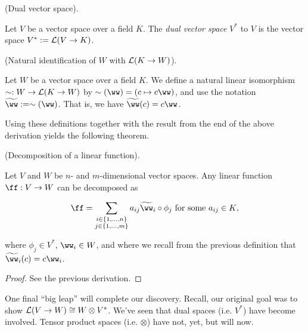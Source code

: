 \begin{defn}
\label{ch::motivated_intro::defn::dual_space_1}
    (Dual vector space).
    
    Let $V$ be a vector space over a field $K$. The \textit{dual vector space} $V^*$ to $V$ is the vector space $V^* := \mathcal{L}(V \rightarrow K)$.
\end{defn}

\begin{defn}
\label{ch::lin_alg::defn::iso_V_to_linear_functions_K_V}
    (Natural identification of $W$ with $\mathcal{L}(K \rightarrow W)$).

    Let $W$ be a vector space over a field $K$. We define a natural linear isomorphism $\sim:W \rightarrow \mathcal{L}(K \rightarrow W)$ by $\sim(\ww) = (c \mapsto c\ww)$, and use the notation $\tww := \sim(\ww)$. That is, we have $\tww(c) = c\ww$.
\end{defn}

Using these definitions together with the result from the end of the above derivation yields the following theorem.

\begin{theorem}
\label{ch::motivated_intro::thm::decomposition_of_a_linear_function}
    (Decomposition of a linear function).
    
    Let $V$ and $W$ be $n$- and $m$-dimensional vector spaces. Any linear function $\ff:V \rightarrow W$ can be decomposed as
    
    \begin{align*}
        \ff = \sum_{\substack{i \in \{1, ..., n\} \\ j \in \{1, ..., m\}}} a_{ij} \tww_i \circ \phi_j \text{ for some $a_{ij} \in K$},
    \end{align*}
    
    where $\phi_j \in V^*$, $\ww_i \in W$, and where we recall from the previous definition that $\tww_i(c) = c\ww_i$.
\end{theorem}

\begin{proof}
    See the previous derivation.
\end{proof}

One final ``big leap'' will complete our discovery. Recall, our original goal was to show ${\mathcal{L}(V \rightarrow W) \cong W \otimes V^*}$. We've seen that dual spaces (i.e. $V^*$) have become involved. Tensor product spaces (i.e. $\otimes$) have not, yet, but will now.

